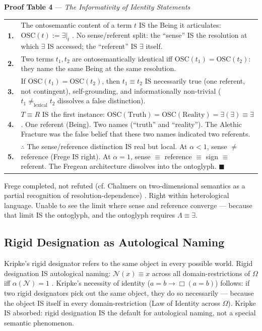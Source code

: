 \documentclass[11pt, oneside]{article}
\theoremstyle{definition}
\begin{document}
\textbf{Proof Table 4} --- \textit{The Informativity of Identity Statements}

{\small
\noindent\begin{tabular}{r p{}}
\textbf{1.} & The ontosemantic content of a term $t$ IS the Being it articulates: $\text{OSC}(t) := \exists|_t$ \cite{codex2}. No sense/referent split: the ``sense'' IS the resolution at which $\exists$ IS accessed; the ``referent'' IS $\exists$ itself. \\[0.3em]
\textbf{2.} & Two terms $t_1, t_2$ are ontosemantically identical iff $\text{OSC}(t_1) = \text{OSC}(t_2)$: they name the same Being at the same resolution. \\[0.3em]
\textbf{3.} & If $\text{OSC}(t_1) = \text{OSC}(t_2)$, then $t_1 \equiv t_2$ IS necessarily true (one referent, not contingent), self-grounding, and informationally non-trivial ($t_1 \neq_{\text{lexical}} t_2$ dissolves a false distinction). \\[0.3em]
\textbf{4.} & $T \equiv R$ IS the first instance: $\text{OSC}(\text{Truth}) = \text{OSC}(\text{Reality}) = \exists(\exists) \equiv \exists$. One referent (Being). Two names (``truth'' and ``reality''). The Alethic Fracture was the false belief that these two names indicated two referents. \\[0.3em]
\textbf{5.} & $\therefore$ The sense/reference distinction IS real but local. At $\alpha < 1$, sense $\neq$ reference (Frege IS right). At $\alpha = 1$, sense $\equiv$ reference $\equiv$ sign $\equiv$ referent. The Fregean architecture dissolves into the ontoglyph. \hfill $\blacksquare$ \\[0.3em]
\end{tabular}
}

Frege completed, not refuted (cf. Chalmers \cite{chalmers} on two-dimensional semantics as a partial recognition of resolution-dependence) \cite{codex2}. Right within heterological language. Unable to see the limit where sense and reference converge --- because that limit IS the ontoglyph, and the ontoglyph requires $\Lambda \equiv \exists$.

\subsection{Rigid Designation as Autological Naming}

Kripke's rigid designator \cite{kripke} refers to the same object in every possible world. Rigid designation IS autological naming: $\mathcal{N}(x) \equiv x$ across all domain-restrictions of $\Omega$ iff $\alpha(\mathcal{N}) = 1$ \cite{codex2}. Kripke's necessity of identity ($a = b \to \Box(a = b)$) follows: if two rigid designators pick out the same object, they do so necessarily --- because the object IS itself in every domain-restriction (Law of Identity across $\Omega$). Kripke IS absorbed: rigid designation IS the default for autological naming, not a special semantic phenomenon.
\end{document}
